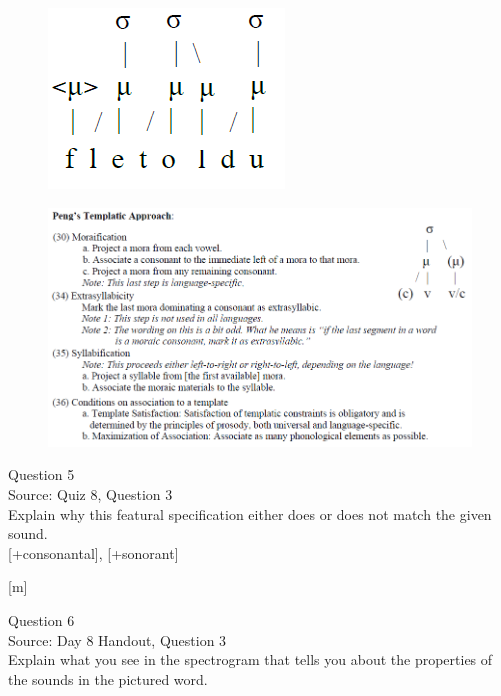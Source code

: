 \documentclass[12pt]{article}
\begin{document}
\begin{figure}[H]
\includegraphics{../images/pengtemplate_fletoldu_no.png}
\end{figure}
\begin{figure}[H]
\includegraphics{../images/peng_template_withdiagram.png}
\end{figure}

\newpage

{\large Question 5}\\

Source: Quiz 8, Question 3\\

Explain why this featural specification either does or does not match the given sound.\\

{[+consonantal]}, {[+sonorant]}

{[m]}


\newpage

{\large Question 6}\\

Source: Day 8 Handout, Question 3\\

Explain what you see in the spectrogram that tells you about the properties of the sounds in the pictured word.\\
\end{document}
